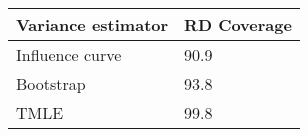 
\begin{longtable}[l]{ll}
\toprule
Variance estimator & RD Coverage\\
\midrule
Influence curve & 90.9\\
Bootstrap & 93.8\\
TMLE & 99.8\\
\bottomrule
\end{longtable}
